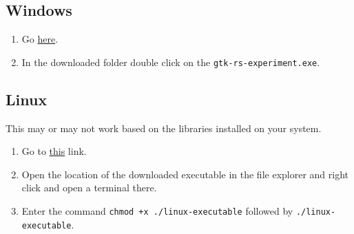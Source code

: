 \documentclass[12pt, a4]{article}
\begin{document}
\subsection{Windows}

\begin{enumerate}
  \item{Go
        \href {https://downgit.github.io/#/home?url=https://github.com/ArchitBhonsle/gtk-rs-experiment/tree/main/windows-package}
        {here}.}
  \item{In the downloaded folder double click on the
        \texttt{gtk-rs-experiment.exe}.}
\end{enumerate}

\subsection{Linux}

This may or may not work based on the libraries installed on your system.

\begin{enumerate}
  \item{Go to \href{https://downgit.github.io/#/home?url=https://github.com/ArchitBhonsle/gtk-rs-experiment/blob/main/linux-executable}{this}
        link.}
  \item{Open the location of the downloaded executable in the file explorer and
        right click and open a terminal there.}
  \item{Enter the command \texttt{chmod +x ./linux-executable} followed by
        \texttt{./linux-executable}.}
\end{enumerate}
\end{document}
